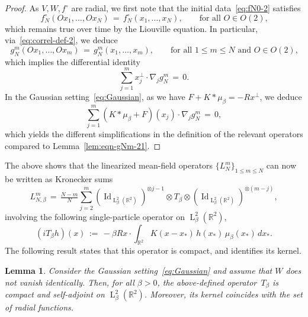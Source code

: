 \documentclass[a4paper,11pt,reqno,noindent]{amsart}
\theoremstyle{plain}
\newtheorem{lem}{Lemma}[section]
\numberwithin{equation}{section}
\newcommand{\R}{\mathbb R}
\newcommand{\Id}{\operatorname{Id}}
\newcommand{\3}{|\!|\!|}
\newcommand{\Ld}{\operatorname{L}}
\begin{document}
\begin{proof}
As $V,W,f^\circ$ are radial, we first note that the initial data~\eqref{eq:fN0-2} satisfies
\[f_N^\circ(Ox_1,\ldots,Ox_N)\,=\,f_N^\circ(x_1,\ldots,x_N),\qquad\text{for all $O\in O(2)$,}\]
which remains true over time by the Liouville equation. In particular, via~\eqref{eq:correl-def-2}, we deduce
\[g_N^m(Ox_1,\ldots,Ox_m)\,=\,g_N^m(x_1,\ldots,x_m),\qquad\text{for all $1\le m\le N$ and $O\in O(2)$,}\]
which implies the differential identity
\[\sum_{j=1}^mx_j^\bot\cdot\nabla_jg_N^m\,=\,0.\]
In the Gaussian setting~\eqref{eq:Gaussian}, as we have $F+K\ast\mu_\beta=-Rx^\bot$, we deduce
\[\sum_{j=1}^m(K\ast\mu_\beta+F)(x_j)\cdot\nabla_jg_N^m\,=\,0,\]
which yields the different simplifications in the definition of the relevant operators compared to Lemma~\ref{lem:eqn-gNm-21}.
\end{proof}


The above shows that the linearized mean-field operators $\{L_N^m\}_{1\le m\le N}$ can now be written as Kronecker sums
\begin{equation}\label{eq:linMF-G}
L_{N,\beta}^m\,=\,\tfrac{N-m}N\sum_{j=2}^m(\Id_{\Ld^2_\beta(\R^2)})^{\otimes j-1}\otimes T_\beta\otimes (\Id_{\Ld^2_\beta(\R^2)})^{\otimes(m-j)},
\end{equation}
involving the following single-particle operator on $\Ld^2_\beta(\R^2)$,
\begin{equation}\label{eq:def-Lbeta}
(iT_\beta h)(x)\,:=\,-\beta Rx\cdot\int_{\R^2} K(x-x_*) \,h(x_*)\,\mu_\beta(x_*)\,dx_*.
\end{equation}
The following result states that this operator is compact, and identifies its kernel.

\begin{lem}\label{lem:Gaus}
Consider the Gaussian setting~\eqref{eq:Gaussian} and assume that $W$ does not vanish identically.
Then, for all $\beta>0$, the above-defined operator~$T_\beta$ is compact and self-adjoint on $\Ld^2_\beta(\R^2)$. Moreover, its kernel coincides with the set of radial functions.
\end{lem}
\end{document}

